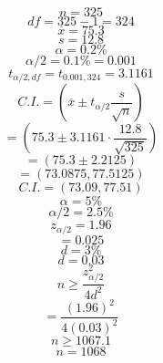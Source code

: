\documentclass{article}
\begin{document}
    $$n=325$$
$$df = 325-1 = 324$$
$$\overline{x} = 75.3$$
$$s = 12.8$$
$$\alpha = 0.2\%$$
$$\alpha/2 = 0.1\% = 0.001$$
$$t_{\alpha/2, df} = t_{0.001, 324} = 3.1161$$
$$C.I. = \left( \overline{x} \pm t_{\alpha/2} \frac{s}{\sqrt{n}} \right)$$
$$= \left( 75.3 \pm 3.1161 \cdot \frac{12.8}{\sqrt{325}} \right)$$
$$= (75.3 \pm 2.2125)$$
$$= (73.0875, 77.5125)$$
$$C.I. = (73.09, 77.51)$$
$$\alpha = 5\%$$
$$\alpha/2 = 2.5\%$$
$$z_{\alpha/2} = 1.96$$
$$= 0.025$$
$$d=3\%$$
$$d = 0.03$$
$$n \ge \frac{z_{\alpha/2}^2}{4d^2}$$
$$= \frac{(1.96)^2}{4(0.03)^2}$$
$$n \ge 1067.1$$
$$n = 1068$$

    
\end{document}
